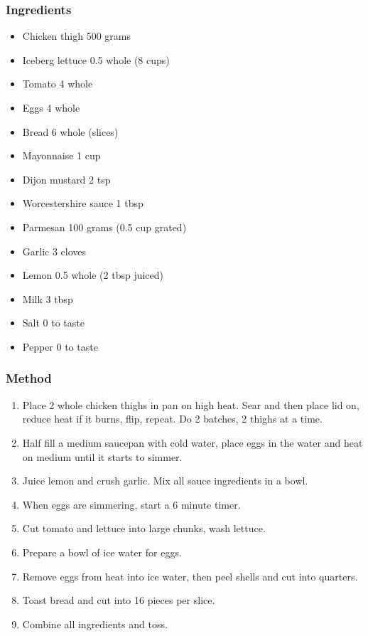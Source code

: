 \documentclass[]{article}
\begin{document}
\subsubsection*{\Large Ingredients}
\begin{multicols}{2}
\begin{itemize}
 \item Chicken thigh \hfill 500 grams
 \item Iceberg lettuce \hfill 0.5 whole (8 cups)
 \item Tomato \hfill 4 whole
 \item Eggs \hfill 4 whole
 \item Bread \hfill 6 whole (slices)
 \item Mayonnaise \hfill 1 cup
 \item Dijon mustard \hfill 2 tsp
 \item Worcestershire sauce \hfill 1 tbsp
 \item Parmesan \hfill 100 grams (0.5 cup grated)
 \item Garlic \hfill 3 cloves
 \item Lemon \hfill 0.5 whole (2 tbsp juiced)
 \item Milk \hfill 3 tbsp
 \item Salt \hfill 0 to taste
 \item Pepper \hfill 0 to taste
\end{itemize}
\end{multicols}
\subsubsection*{\Large Method}
\begin{enumerate}[font=\huge\color{accent}]
	\item Place 2 whole chicken thighs in pan on high heat. Sear and then place lid on, reduce heat if it burns, flip, repeat. Do 2 batches, 2 thighs at a time.
	\item Half fill a medium saucepan with cold water, place eggs in the water and heat on medium until it starts to simmer.
	\item Juice lemon and crush garlic. Mix all sauce ingredients in a bowl.
	\item When eggs are simmering, start a 6 minute timer.
	\item Cut tomato and lettuce into large chunks, wash lettuce.
	\item Prepare a bowl of ice water for eggs.
	\item Remove eggs from heat into ice water, then peel shells and cut into quarters.
	\item Toast bread and cut into 16 pieces per slice.
	\item Combine all ingredients and toss.
\end{enumerate}
\end{document}
